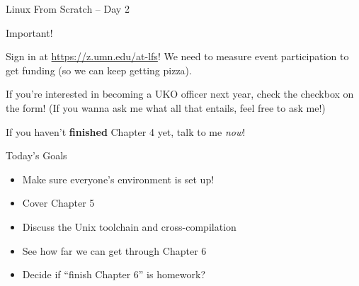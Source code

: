 \documentclass[aspectratio=169]{beamer}
\date{February 19, 2025}
\begin{document}
\begin{frame}{Linux From Scratch -- Day 2}
	\small
	\begin{alertblock}{Important!}
		\vspace{0.5em}

		Sign in at \url{https://z.umn.edu/at-lfs}!
		We need to measure event participation to get funding (so we can keep getting pizza).

		\vspace{0.5em}

		If you're interested in becoming a UKO officer next year, check the checkbox on the form!
		(If you wanna ask me what all that entails, feel free to ask me!)

		\vspace{0.5em}

		If you haven't \textbf{finished} Chapter 4 yet, talk to me \textit{now}!

		\vspace{0.5em}
	\end{alertblock}
\end{frame}

\begin{frame}
	\begin{block}{Today's Goals}
		\vspace{0.5em}
		\begin{itemize}
			\item Make sure everyone's environment is set up!
			\item Cover Chapter 5
			\item Discuss the Unix toolchain and cross-compilation
			\item See how far we can get through Chapter 6
			\item Decide if ``finish Chapter 6'' is homework?
		\end{itemize}
		\vspace{0.5em}
	\end{block}
\end{frame}
\end{document}
